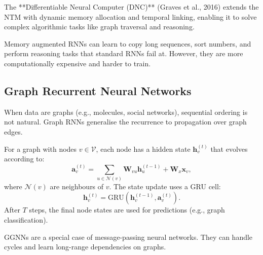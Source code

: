 \documentclass{tufte-handout}
\begin{document}
The **Differentiable Neural Computer (DNC)** (Graves et al., 2016) extends the NTM with dynamic memory allocation and temporal linking, enabling it to solve complex algorithmic tasks like graph traversal and reasoning.

\begin{marginfigure}
\centering
{}
\caption{Neural Turing Machine: an RNN controller accesses an external memory matrix.}
\end{marginfigure}

Memory augmented RNNs can learn to copy long sequences, sort numbers, and perform reasoning tasks that standard RNNs fail at. However, they are more computationally expensive and harder to train.

\subsection{Graph Recurrent Neural Networks}

When data are graphs (e.g., molecules, social networks), sequential ordering is not natural. Graph RNNs generalise the recurrence to propagation over graph edges.

\begin{defn}
    For a graph with nodes $v \in \mathcal{V}$, each node has a hidden state $\mathbf{h}_v^{(t)}$ that evolves according to:
    \[
    \mathbf{a}_v^{(t)} = \sum_{u \in \mathcal{N}(v)} \mathbf{W}_{vu} \mathbf{h}_u^{(t-1)} + \mathbf{W}_x \mathbf{x}_v,
    \]
    where $\mathcal{N}(v)$ are neighbours of $v$. The state update uses a GRU cell:
    \[
    \mathbf{h}_v^{(t)} = \text{GRU}(\mathbf{h}_v^{(t-1)}, \mathbf{a}_v^{(t)}).
    \]
    After $T$ steps, the final node states are used for predictions (e.g., graph classification).
\end{defn}

GGNNs are a special case of message-passing neural networks. They can handle cycles and learn long-range dependencies on graphs.

\begin{marginfigure}
\centering
{}
\caption{In a Graph RNN, each node’s state is updated using messages from neighbours.}
\end{marginfigure}
\end{document}
